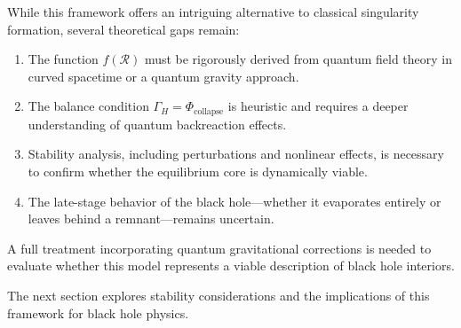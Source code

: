 While this framework offers an intriguing alternative to classical singularity formation, several theoretical gaps remain:
\begin{enumerate}
    \item The function \( f(\mathcal{R}) \) must be rigorously derived from quantum field theory in curved spacetime or a quantum gravity approach.
    \item The balance condition \( \Gamma_H = \Phi_{\text{collapse}} \) is heuristic and requires a deeper understanding of quantum backreaction effects.
    \item Stability analysis, including perturbations and nonlinear effects, is necessary to confirm whether the equilibrium core is dynamically viable.
    \item The late-stage behavior of the black hole—whether it evaporates entirely or leaves behind a remnant—remains uncertain.
\end{enumerate}

A full treatment incorporating quantum gravitational corrections is needed to evaluate whether this model represents a viable description of black hole interiors.

The next section explores stability considerations and the implications of this framework for black hole physics.
